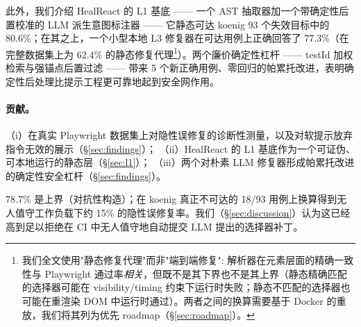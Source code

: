 此外，我们介绍 HealReact 的 L1 基底 —— 一个 AST 抽取器加一个带确定性后置校准的 LLM 派生意图标注器 —— 它静态可达 koenig 93 个失效目标中的 80.6\%；在其之上，一个小型本地 L3 修复器在可达用例上正确回答了 77.3\%（在完整数据集上为 62.4\% 的静态修复代理\footnote{我们全文使用"静态修复代理"而非"端到端修复": 解析器在元素层面的精确一致性与 Playwright 通过率\emph{相关}，但既不是其下界也不是其上界（静态精确匹配的选择器可能在 visibility/timing 约束下运行时失败；静态不匹配的选择器也可能在重渲染 DOM 中运行时通过）。两者之间的换算需要基于 Docker 的重放，我们将其列为优先 roadmap（\S\ref{sec:roadmap}）。}）。两个廉价确定性杠杆 —— testId 加权检索与强锚点后置过滤 —— 带来 5 个新正确用例、零回归的帕累托改进，表明确定性后处理比提示工程更可靠地起到安全网作用。

\paragraph{贡献。}
（i）在真实 Playwright 数据集上对隐性误修复的诊断性测量，以及对软提示放弃指令无效的展示（\S\ref{sec:findings}）；
（ii）HealReact 的 L1 基底作为一个可证伪、可本地运行的静态层（\S\ref{sec:l1}）；
（iii）两个对朴素 LLM 修复器形成帕累托改进的确定性安全杠杆（\S\ref{sec:findings}）。

78.7\% 是上界（对抗性构造）；在 koenig 真正不可达的 18/93 用例上换算得到无人值守工作负载下约 15\% 的隐性误修复率。我们（\S\ref{sec:discussion}）认为这已经高到足以拒绝在 CI 中无人值守地自动提交 LLM 提出的选择器补丁。

